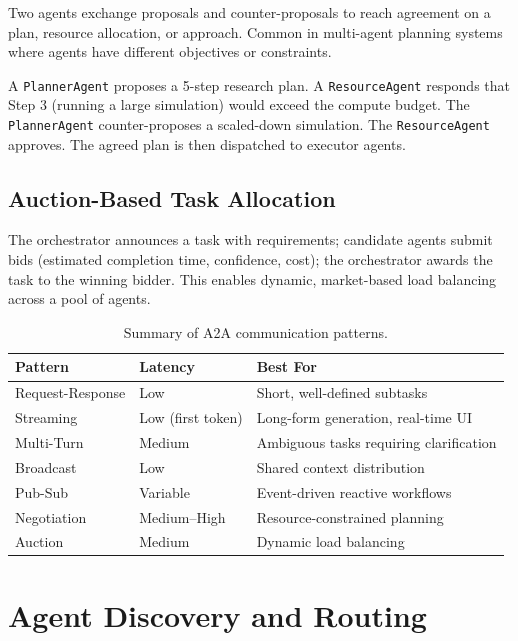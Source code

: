 Two agents exchange proposals and counter-proposals to reach agreement on a plan, resource allocation, or approach. Common in multi-agent planning systems where agents have different objectives or constraints.

\begin{examplebox}
A \texttt{PlannerAgent} proposes a 5-step research plan. A \texttt{ResourceAgent} responds that Step 3 (running a large simulation) would exceed the compute budget. The \texttt{PlannerAgent} counter-proposes a scaled-down simulation. The \texttt{ResourceAgent} approves. The agreed plan is then dispatched to executor agents.
\end{examplebox}

\subsection{Auction-Based Task Allocation}
\label{auction-based-task-allocation}

The orchestrator announces a task with requirements; candidate agents submit bids (estimated completion time, confidence, cost); the orchestrator awards the task to the winning bidder. This enables dynamic, market-based load balancing across a pool of agents.

\begin{table}[ht!]
\centering
\caption{Summary of A2A communication patterns.}
\begin{tabular}{@{}lp{5cm}p{8cm}@{}}
\toprule
\textbf{Pattern} & \textbf{Latency} & \textbf{Best For} \\
\midrule
Request-Response & Low & Short, well-defined subtasks \\
Streaming & Low (first token) & Long-form generation, real-time UI \\
Multi-Turn & Medium & Ambiguous tasks requiring clarification \\
Broadcast & Low & Shared context distribution \\
Pub-Sub & Variable & Event-driven reactive workflows \\
Negotiation & Medium--High & Resource-constrained planning \\
Auction & Medium & Dynamic load balancing \\
\bottomrule
\end{tabular}
\end{table}

\section{Agent Discovery and Routing}
\label{sec:a2a:discovery}


